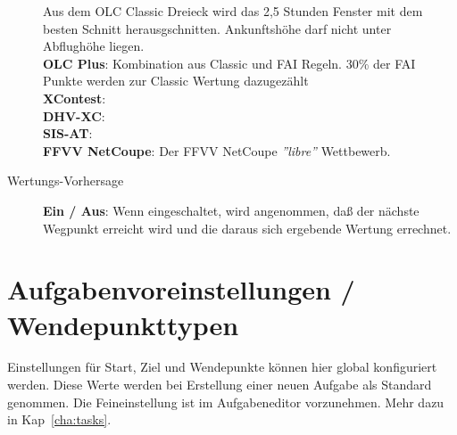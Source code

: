 \begin{description}
   Aus dem OLC Classic Dreieck wird das 2,5 Stunden Fenster mit dem besten Schnitt herausgschnitten.
   Ankunftshöhe darf nicht unter Abflughöhe liegen.\\
  {\bf OLC Plus}: Kombination aus Classic und FAI Regeln. 30\% der FAI Punkte werden zur
   Classic Wertung dazugezählt \\
  {\bf XContest}:  \\
  {\bf DHV-XC}:  \\
  {\bf SIS-AT}:  \\
  {\bf FFVV NetCoupe}: Der FFVV NetCoupe {\it ''libre''} Wettbewerb.
\item[Wertungs-Vorhersage]  {\bf Ein / Aus}: Wenn eingeschaltet, wird angenommen, daß der nächste Wegpunkt erreicht wird und
die daraus sich ergebende Wertung errechnet.
\end{description}


\section{Aufgabenvoreinstellungen  / Wendepunkttypen}

Einstellungen für Start, Ziel und Wendepunkte können hier global konfiguriert werden.
Diese Werte werden bei Erstellung einer neuen Aufgabe als Standard genommen.
Die Feineinstellung  ist im Aufgabeneditor vorzunehmen.
Mehr dazu in Kap~\ref{cha:tasks}. 



